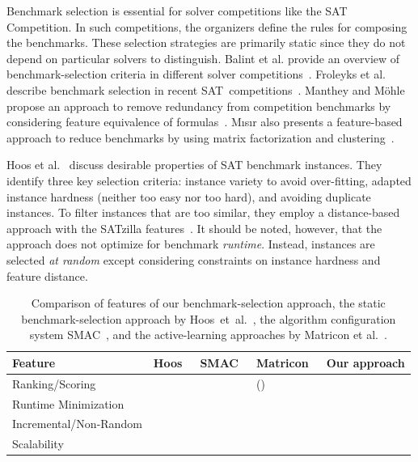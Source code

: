 \documentclass[sn-basic, Numbered]{sn-jnl} %
\newcommand{\cmark}{\ding{51}} %
\newcommand{\xmark}{\ding{55}}
\begin{document}
Benchmark selection is essential for solver competitions like the SAT Competition.
In such competitions, the organizers define the rules for composing the benchmarks.
These selection strategies are primarily static since they do not depend on particular solvers to distinguish.
Balint et al. provide an overview of benchmark-selection criteria in different solver competitions~\cite{balint2015overview}.
Froleyks et al. describe benchmark selection in recent SAT~competitions~\cite{FroleyksHIJS21}.
Manthey and Möhle propose an approach to remove redundancy from competition benchmarks by considering feature equivalence of formulas~\cite{manthey2016better}.
M{\i}s{\i}r also presents a feature-based approach to reduce benchmarks by using matrix factorization and clustering~\cite{misir2021benchmark}.

Hoos et al.~\cite{HoosKSS13} discuss desirable properties of SAT benchmark instances.
They identify three key selection criteria: instance variety to avoid over-fitting, adapted instance hardness (neither too easy nor too hard), and avoiding duplicate instances. 
To filter instances that are too similar, they employ a distance-based approach with the SATzilla features~\cite{XuHHL08,features}.
It should be noted, however, that the approach does not optimize for benchmark \emph{runtime}.
Instead, instances are selected \emph{at random} except considering constraints on instance hardness and feature distance.

\begin{table}[tbp]
  \centering
  \caption{Comparison of features of our benchmark-selection approach, the static benchmark-selection approach by Hoos~et~al.~\cite{HoosKSS13}, the algorithm configuration system SMAC~\cite{HutterHL11}, and the active-learning approaches by Matricon et al.~\cite{MatriconAFSH21}.
  }
  \label{tab:requirements}
  \begin{tabular}{
    m{}
    >{\centering\arraybackslash}m{}
    >{\centering\arraybackslash}m{}
    >{\centering\arraybackslash}m{}
    >{\centering\arraybackslash}m{}
  }
    \toprule
    Feature & Hoos~\cite{HoosKSS13} & SMAC~\cite{HutterHL11} & Matricon~\cite{MatriconAFSH21} & Our approach \\
    \midrule
    Ranking/Scoring & \cmark & \xmark & (\cmark) & \cmark \\
    Runtime Minimization & \xmark & \cmark & \cmark & \cmark \\
    Incremental/Non-Random & \xmark & \xmark & \cmark & \cmark \\
    Scalability & \cmark & \cmark & \xmark & \cmark \\
    \bottomrule
  \end{tabular}
\end{table}
\end{document}

